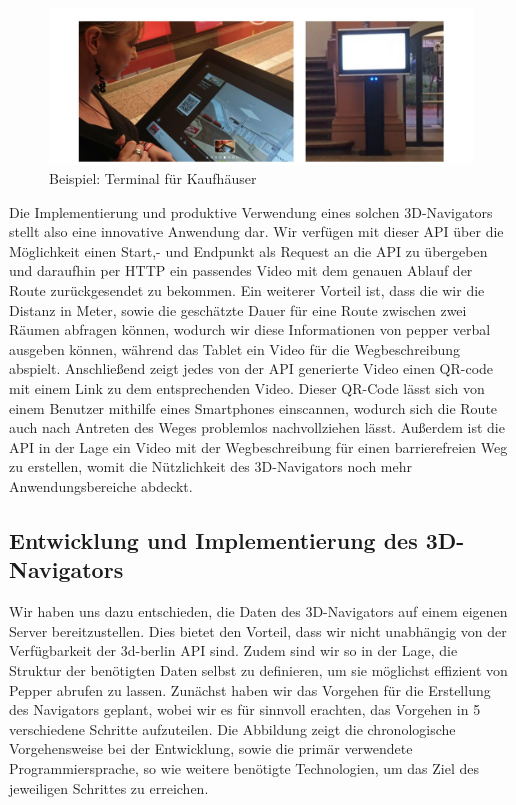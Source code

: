 \begin{figure}[H]
    \includegraphics[width=\textwidth]{Figures/3DNavigator/terminal_bsp.jpg}
    \caption{Beispiel: Terminal für Kaufhäuser}
    \label{fig:integration}
    \centering
\end{figure}

Die Implementierung und produktive Verwendung eines solchen 3D-Navigators stellt also eine innovative Anwendung dar. Wir verfügen mit dieser API über die Möglichkeit einen Start,- und Endpunkt als Request an die API zu übergeben und daraufhin per HTTP ein passendes Video mit dem genauen Ablauf der Route zurückgesendet zu bekommen. Ein weiterer Vorteil ist, dass die wir die Distanz in Meter, sowie die geschätzte Dauer für eine Route zwischen zwei Räumen abfragen können, wodurch wir diese Informationen von pepper verbal ausgeben können, während das Tablet ein Video für die Wegbeschreibung abspielt. Anschließend zeigt jedes von der API generierte Video einen QR-code mit einem Link zu dem entsprechenden Video. Dieser QR-Code lässt sich von einem Benutzer mithilfe eines Smartphones einscannen, wodurch sich die Route auch nach Antreten des Weges problemlos nachvollziehen lässt. Außerdem ist die API in der Lage ein Video mit der Wegbeschreibung für einen barrierefreien Weg zu erstellen, womit die Nützlichkeit des 3D-Navigators noch mehr Anwendungsbereiche abdeckt.

\subsection{Entwicklung und Implementierung des 3D-Navigators}

Wir haben uns dazu entschieden, die Daten des 3D-Navigators auf einem eigenen Server bereitzustellen. Dies bietet den Vorteil, dass wir nicht unabhängig von der Verfügbarkeit der 3d-berlin API sind. Zudem sind wir so in der Lage, die Struktur der benötigten Daten selbst zu definieren, um sie möglichst effizient von Pepper abrufen zu lassen. Zunächst haben wir das Vorgehen für die Erstellung des Navigators geplant, wobei wir es für sinnvoll erachten, das Vorgehen in 5 verschiedene Schritte aufzuteilen. Die Abbildung zeigt die chronologische Vorgehensweise bei der Entwicklung, sowie die primär verwendete Programmiersprache, so wie weitere benötigte Technologien, um das Ziel des jeweiligen Schrittes zu erreichen.

